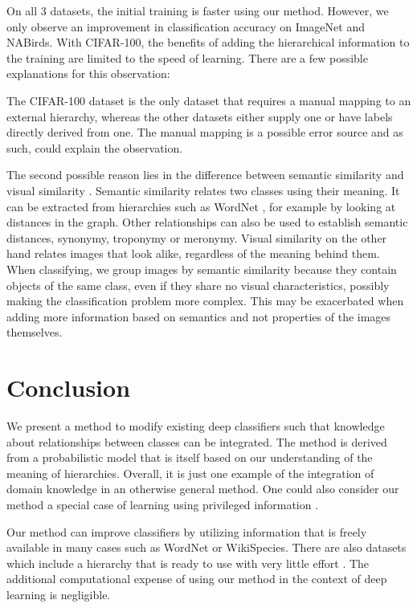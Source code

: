 \documentclass[10pt,twocolumn,letterpaper]{article}
\begin{document}
On all 3 datasets, the initial training is faster using our method. However,
we only observe an improvement in classification accuracy on ImageNet
and NABirds. With CIFAR-100, the benefits of adding the hierarchical information
to the training are limited to the speed of learning. There are a few possible
explanations for this observation:

The CIFAR-100 dataset is the only dataset that requires a manual mapping to
an external hierarchy, whereas the other datasets either supply one or have
labels directly derived from one. The manual mapping is a possible error source
and as such, could explain the observation.

The second possible reason lies in the difference between semantic similarity
and visual similarity \cite{Deselaers2011Visual}. Semantic similarity relates two classes using their
meaning. It can be extracted from hierarchies such as WordNet \cite{Fellbaum1998WordNet},
for example by looking at distances in the graph. Other relationships can also
be used to establish semantic distances, \eg synonymy, troponymy or meronymy.
Visual similarity on the other hand relates images that look alike, regardless
of the meaning behind them. When classifying, we group images by semantic similarity
because they contain objects of the same class, even if they share no visual characteristics,
possibly making the classification problem more complex. This may be exacerbated when adding
more information based on semantics and not properties of the images themselves.



\section{Conclusion}
We present a method to modify existing deep classifiers such that knowledge
about relationships between classes can be integrated. The method is derived
from a probabilistic model that is itself based on our understanding of the
meaning of hierarchies. Overall, it is just one example of the integration
of domain knowledge in an otherwise general method. One could also consider
our method a special case of learning using privileged information
\cite{Vapnik2009LUPI}.

Our method can improve classifiers by utilizing information that is freely
available in many cases such as WordNet \cite{Fellbaum1998WordNet} or
WikiSpecies.
There are also datasets which include a hierarchy that is ready to use with
very little effort \cite{Deng2009ImageNet,VanHorn2015NAB}.
The additional computational expense of using our method in the context
of deep learning is negligible.






{\small


}
\end{document}
